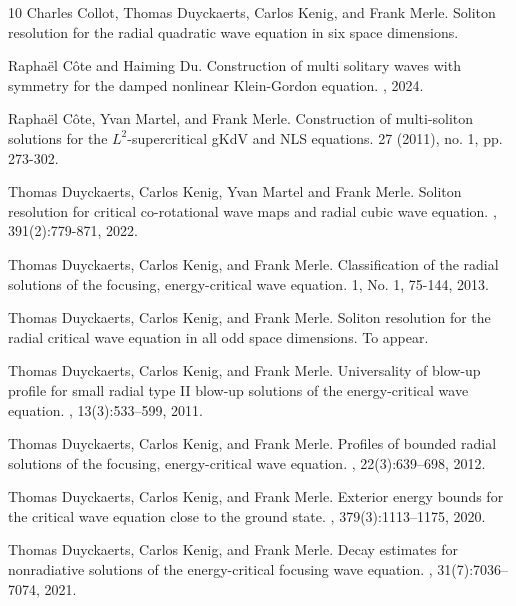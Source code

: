 \documentclass[a4paper,two-side,10pt]{amsart}
\numberwithin{equation}{section}
\begin{document}
\begin{thebibliography}{10}
Charles Collot, Thomas Duyckaerts, Carlos Kenig, and Frank Merle.
\newblock Soliton resolution for the radial quadratic wave equation in six space dimensions.

Rapha\" el C\^ ote and Haiming Du.
\newblock Construction of multi solitary waves with symmetry for the damped nonlinear Klein-Gordon equation.
, 2024.


Rapha\" el C\^ ote, Yvan Martel, and Frank Merle.
\newblock Construction of multi-soliton solutions for the $L^2$-supercritical gKdV and NLS equations.
 27 (2011), no. 1, pp. 273-302.


 Thomas Duyckaerts, Carlos Kenig, Yvan Martel and Frank Merle.
\newblock Soliton resolution for critical co-rotational wave maps and radial cubic wave equation.
, 391(2):779-871, 2022.

Thomas Duyckaerts, Carlos Kenig, and Frank Merle.
\newblock Classification of the radial solutions of the focusing, energy-critical wave equation. 
 1, No. 1, 75-144, 2013.

Thomas Duyckaerts, Carlos Kenig, and Frank Merle.
\newblock Soliton resolution for the radial critical wave equation in all odd
  space dimensions.
\newblock To appear.

Thomas Duyckaerts, Carlos Kenig, and Frank Merle.
\newblock Universality of blow-up profile for small radial type {II} blow-up
  solutions of the energy-critical wave equation.
, 13(3):533--599, 2011.

Thomas Duyckaerts, Carlos Kenig, and Frank Merle.
\newblock Profiles of bounded radial solutions of the focusing, energy-critical
  wave equation.
, 22(3):639--698, 2012.

Thomas Duyckaerts, Carlos Kenig, and Frank Merle.
\newblock Exterior energy bounds for the critical wave equation close to the
  ground state.
, 379(3):1113--1175, 2020.

Thomas Duyckaerts, Carlos Kenig, and Frank Merle.
\newblock Decay estimates for nonradiative solutions of the energy-critical
  focusing wave equation.
, 31(7):7036--7074, 2021.


\end{thebibliography}
\end{document}
